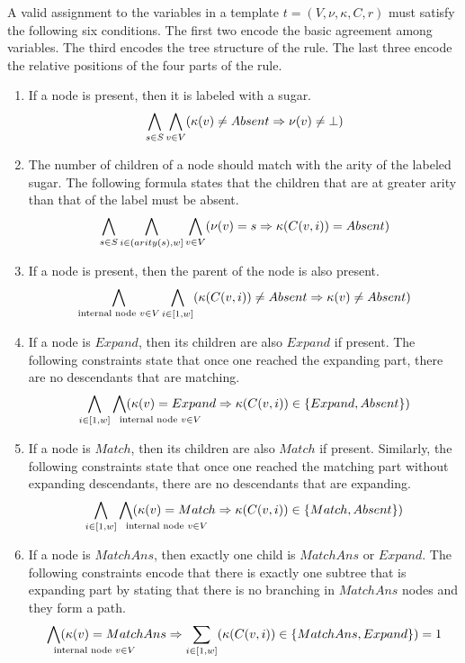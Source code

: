 A valid assignment to the variables in
a template  $t = (V, \nu, \kappa, C, r)$ must
satisfy the following six conditions.
The first two encode the basic agreement among variables.
The third encodes the tree structure of the rule.
The last three encode the relative positions of the four
parts of the rule.
\begin{enumerate}
\item If a node is present, then it is labeled with a sugar.
$$
\bigwedge_{s \in S} \bigwedge_{v \in V} (\kappa(v) \neq Absent \Rightarrow \nu(v) \neq \bot )
$$
\item  The number of children of a node should match with the arity of the labeled sugar.
  The following formula states that the children that are at greater arity than that of the label
  must be absent.
$$
\bigwedge_{s \in S} \bigwedge_{i \in (arity(s),w] }\bigwedge_{v \in V} (\nu(v) = s \Rightarrow \kappa( C(v,i) ) = Absent )
$$
\item If a node is present, then the parent of the node is also present.
  $$
  \bigwedge_{{\text{internal node } v \in V}}
  \bigwedge_{i\in[1,w]} (\kappa(C(v,i) ) \neq Absent \Rightarrow \kappa( v ) \neq Absent )  
  $$
\item If a node is $Expand$, then its children are also $Expand$ if present. The following constraints state that once one reached the expanding part, there
are no descendants that are matching.
  $$
\Land_{i\in[1,w]} \Land_{\mathrlap{\text{internal node } v \in V}} (\kappa(v) = Expand \limplies \kappa(C(v,i)) \in \{Expand,Absent\}   )
$$
\item If a node is $Match$, then its children are also $Match$ if present.
  Similarly, the following constraints state that once one reached the matching part without expanding descendants, there are no descendants that are expanding.
$$
\Land_{i\in[1,w]} \Land_{\mathrlap{\text{internal node } v \in V}} (\kappa(v) = Match \limplies \kappa(C(v,i)) \in \{Match,Absent\}   )
$$
\item If a node is $MatchAns$, then exactly one child is $MatchAns$ or $Expand$.
  The following constraints encode that there is exactly one subtree that is expanding part
  by stating that there is no branching in $MatchAns$ nodes and they form a path.  
$$
\Land_{\mathrlap{\text{internal node } v \in V}} (\kappa(v) = MatchAns \limplies \sum_{i\in[1,w]}( \kappa(C(v,i)) \in \{MatchAns,Expand\}) = 1
$$
\end{enumerate}

